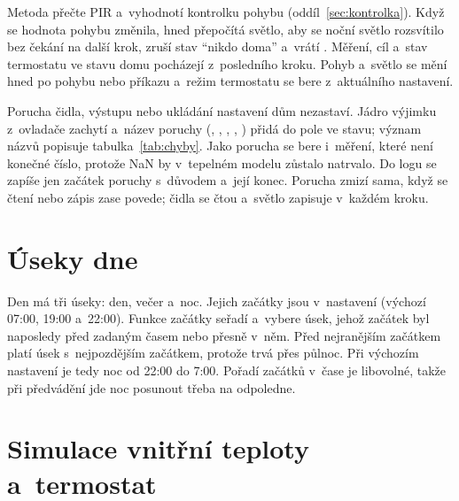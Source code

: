 Metoda  přečte PIR a~vyhodnotí kontrolku pohybu (oddíl~\ref{sec:kontrolka}).
Když se hodnota pohybu změnila, hned přepočítá světlo, aby se noční světlo rozsvítilo bez čekání
na další krok, zruší stav \enquote{nikdo doma} a~vrátí . Měření, cíl a~stav termostatu
ve stavu domu pocházejí z~posledního kroku. Pohyb a~světlo se mění hned po pohybu nebo příkazu
a~režim termostatu se bere z~aktuálního nastavení.

Porucha čidla, výstupu nebo ukládání nastavení dům nezastaví. Jádro výjimku 
z~ovladače zachytí a~název poruchy (, , , ,
) přidá do pole  ve stavu; význam názvů popisuje
tabulka~\ref{tab:chyby}. Jako porucha se bere i~měření, které není konečné číslo, protože NaN
by v~tepelném modelu zůstalo natrvalo. Do logu se zapíše jen začátek poruchy s~důvodem a~její
konec. Porucha zmizí sama, když se čtení nebo zápis zase povede; čidla se čtou a~světlo zapisuje
v~každém kroku.

\section{Úseky dne}
\label{sec:useky}

Den má tři úseky: den, večer a~noc. Jejich začátky jsou v~nastavení (výchozí 07:00, 19:00
a~22:00). Funkce  začátky seřadí a~vybere úsek, jehož začátek byl naposledy před
zadaným časem nebo přesně v~něm. Před nejranějším začátkem platí úsek s~nejpozdějším začátkem,
protože trvá přes půlnoc. Při výchozím nastavení je tedy noc od 22:00 do 7:00. Pořadí začátků
v~čase je libovolné, takže při předvádění jde noc posunout třeba na odpoledne.

\section{Simulace vnitřní teploty a~termostat}
\label{sec:termostat}

